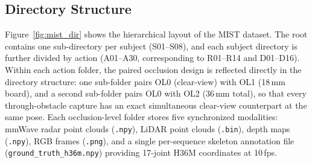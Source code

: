 \documentclass{article}
\begin{document}
\begin{table}[h]
  \centering
  \caption{
    MIST sensor specifications.
    N/A indicates the parameter is not applicable to that modality.
  }
  \label{tab:mist_sensor}
  \small
  \setlength{\tabcolsep}{4pt}
\end{table}

\subsection{Directory Structure}

Figure~\ref{fig:mist_dir} shows the hierarchical layout of the MIST dataset.
The root contains one sub-directory per subject (S01--S08), and each subject
directory is further divided by action (A01--A30, corresponding to R01--R14 and
D01--D16).
Within each action folder, the paired occlusion design is reflected directly in
the directory structure: one sub-folder pairs OL0 (clear-view) with OL1
(18\,mm board), and a second sub-folder pairs OL0 with OL2 (36\,mm total),
so that every through-obstacle capture has an exact simultaneous clear-view
counterpart at the same pose.
Each occlusion-level folder stores five synchronized modalities: mmWave radar
point clouds (\texttt{.npy}), LiDAR point clouds (\texttt{.bin}), depth maps
(\texttt{.npy}), RGB frames (\texttt{.png}), and a single per-sequence skeleton
annotation file (\texttt{ground\_truth\_h36m.npy}) providing 17-joint H36M
coordinates at 10\,fps.
\end{document}
